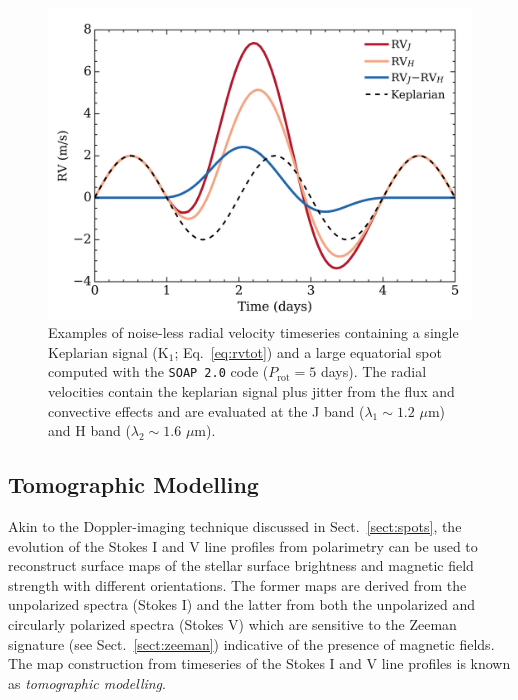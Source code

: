 \begin{figure}
\centering
\includegraphics[scale=.6]{figures/rvjitterdiff.png}
\caption{Examples of noise-less radial velocity timeseries containing a single Keplarian 
signal (K$_1$; Eq.~\ref{eq:rvtot}) and a large equatorial spot computed with the 
\texttt{SOAP 2.0} code ($P_{\mathrm{rot}}=5$ days). 
The radial velocities contain the keplarian signal plus jitter from the flux 
and convective effects and are evaluated at the J band ($\lambda_1 \sim 1.2$ $\mu$m) and H band 
($\lambda_2 \sim 1.6$ $\mu$m). \label{fig:jitterdiff}}
\end{figure}

\subsection{Tomographic Modelling}
Akin to the Doppler-imaging technique discussed in Sect.~\ref{sect:spots}, the evolution of the 
Stokes I and V line profiles from polarimetry 
can be used to reconstruct surface maps of the stellar surface 
brightness and magnetic field strength with different orientations. The former maps are 
derived from the unpolarized spectra (Stokes I) and the latter from both 
the unpolarized and circularly polarized 
spectra (Stokes V) which are sensitive to the Zeeman signature (see Sect.~\ref{sect:zeeman}) 
indicative of the presence of 
magnetic fields. The map construction from timeseries of the Stokes I and V line profiles is 
known as \emph{tomographic modelling}. \\

